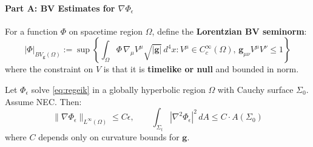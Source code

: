 \paragraph{Part A: BV Estimates for $\nabla\Phi_\epsilon$}

\begin{definition}
For a function $\Phi$ on spacetime region $\Omega$, define the \textbf{Lorentzian BV seminorm}:
\begin{equation}
    |\Phi|_{BV_{\mathbf{g}}(\Omega)} := \sup\left\{\int_\Omega \Phi \, \nabla_\mu V^\mu \sqrt{|\mathbf{g}|}\, d^4x : V^\mu \in C^\infty_c(\Omega), \, \mathbf{g}_{\mu\nu}V^\mu V^\nu \leq 1\right\}
\end{equation}
where the constraint on $V$ is that it is \textbf{timelike or null} and bounded in norm.
\end{definition}

\begin{theorem}\label{thm:BVbound}
Let $\Phi_\epsilon$ solve \eqref{eq:regeik} in a globally hyperbolic region $\Omega$ with Cauchy surface $\Sigma_0$. Assume NEC. Then:
\begin{equation}
    \|\nabla\Phi_\epsilon\|_{L^\infty(\Omega)} \leq C\epsilon, \qquad \int_{\Sigma_t} |\nabla^2\Phi_\epsilon|^2 \, dA \leq C \cdot A(\Sigma_0)
\end{equation}
where $C$ depends only on curvature bounds for $\mathbf{g}$.
\end{theorem}

